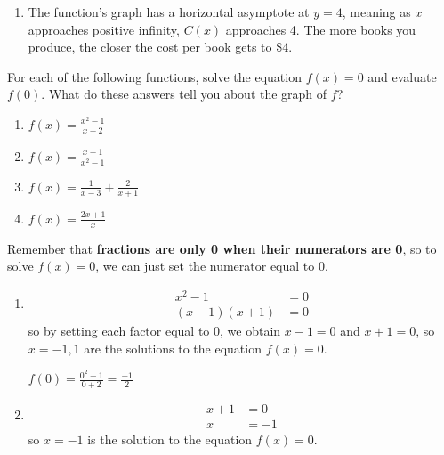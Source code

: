\documentclass[noauthor]{ximera}
\begin{document}
\begin{problem}
\begin{explanation}
\begin{enumerate}
    This means that when half a book is produced, the cost per book is \$244. That doesn't make much sense, since people usually don't produce half books, but 
    it could be the cost per book when the book is half as long.

    \item The function's graph has a horizontal asymptote at  \(y = 4\), meaning as \(x\) approaches positive infinity, \(C(x)\) approaches 4.
    The more books you produce, the closer the cost per book gets to \$4. 
\end{enumerate}
\end{explanation}
\end{problem}

\begin{problem}
For each of the following functions, solve the equation \(f(x) = 0\)
and evaluate \(f(0)\). What do these answers tell you about the graph 
of \(f\)?

\begin{enumerate}
    \item \(f(x) = \frac{x^2 - 1}{x + 2}\)
    \item \(f(x) = \frac{x + 1}{x^2 - 1}\)
    \item \(f(x) = \frac{1}{x - 3} + \frac{2}{x + 1}\)
    \item \(f(x) = \frac{2x + 1}{x}\)
\end{enumerate}

\begin{explanation}
Remember that \textbf{fractions are only 0 when their numerators are 0}, so to solve \(f(x) = 0\), we can just set the numerator equal to 0.
\begin{enumerate}
    \item 
    \begin{align*}
        x^2 - 1 & = 0 \\
        (x - 1)(x + 1) & = 0
    \end{align*}
    so by setting each factor equal to 0, we obtain \(x - 1 = 0\) and \(x + 1 = 0\), so \(x = -1, 1\) are the solutions to the equation \(f(x) = 0\).

    \(f(0) = \frac{0^2 - 1}{0 + 2} = \frac{-1}{2}\)

    \item
    \begin{align*}
        x + 1 & = 0 \\
        x & = -1
    \end{align*}
    so \(x = -1\) is the solution to the equation \(f(x) = 0\).


\end{enumerate}
\end{explanation}
\end{problem}
\end{document}

